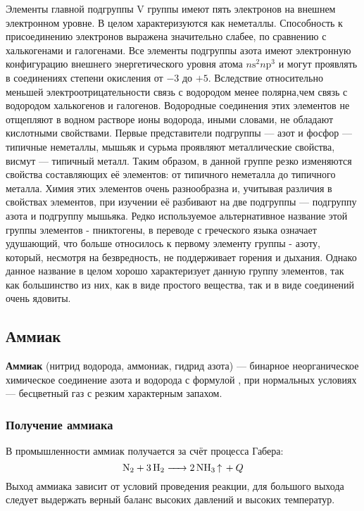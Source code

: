      Элементы главной подгруппы V группы имеют пять электронов на внешнем электронном уровне. В целом характеризуются как неметаллы. Способность к присоединению электронов выражена значительно слабее, по сравнению с халькогенами и галогенами. Все элементы подгруппы азота имеют электронную конфигурацию внешнего энергетического уровня атома $n\mathrm{s}^{2}n\mathrm{p}^{3}$ и могут проявлять в соединениях степени окисления от $-3$ до $+5$. Вследствие относительно меньшей электроотрицательности связь с водородом менее полярна,чем связь с водородом халькогенов и галогенов. Водородные соединения этих элементов не отщепляют в водном растворе ионы водорода, иными словами, не обладают кислотными свойствами. Первые представители подгруппы — азот и фосфор — типичные неметаллы, мышьяк и сурьма проявляют металлические свойства, висмут — типичный металл. Таким образом, в данной группе резко изменяются свойства составляющих её элементов: от типичного неметалла до типичного металла. Химия этих элементов очень разнообразна и, учитывая различия в свойствах элементов, при изучении её разбивают на две подгруппы — подгруппу азота и подгруппу мышьяка. Редко используемое альтернативное название этой группы элементов - пниктогены, в переводе с греческого языка означает удушающий, что больше относилось к первому элементу группы - азоту, который, несмотря на безвредность, не поддерживает горения и дыхания. Однако данное название в целом хорошо характеризует данную группу элементов, так как большинство из них, как в виде простого вещества, так и в виде соединений очень ядовиты.
     \subsection{Аммиак}
     \textbf{Аммиак} (нитрид водорода, аммониак, гидрид азота) — бинарное неорганическое химическое соединение азота и водорода с формулой , при нормальных условиях — бесцветный газ с резким характерным запахом.
     \subsubsection{Получение аммиака}
     В промышленности аммиак получается за счёт процесса Габера:
     \begin{equation*}
        \ce{N2 + 3H2 -> 2NH3 ^} + Q 
     \end{equation*}
     Выход аммиака зависит от условий проведения реакции, для большого выхода следует выдержать верный баланс высоких давлений и высоких температур.
     
